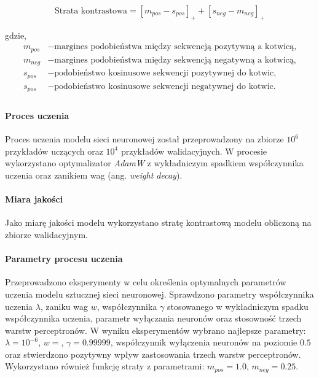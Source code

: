                 \begin{equation}
                    \text{Strata kontrastowa} = [m_{pos} - s_{pos}]_{+} + [s_{neg} - m_{neg}]_{+}
                \end{equation}

                gdzie,
                \begin{align*}
                    m_{pos} &- \text{margines podobieństwa między sekwencją pozytywną a kotwicą,} \\
                    m_{neg} &- \text{margines podobieństwa między sekwencją negatywną a kotwicą,} \\
                    s_{pos} &- \text{podobieństwo kosinusowe sekwencji pozytywnej do kotwic,} \\
                    s_{pos} &- \text{podobieństwo kosinusowe sekwencji negatywnej do kotwic.} \\
                \end{align*}

            \paragraph{Proces uczenia}
                Proces uczenia modelu sieci neuronowej został przeprowadzony na zbiorze $10^{6}$ przykładów uczących oraz $10^{4}$ przykładów walidacyjnych. 
                W procesie wykorzystano optymalizator \textit{AdamW}\cite{Loshchilov2017DecoupledWD} z wykładniczym spadkiem współczynnika uczenia oraz zanikiem wag (ang. \textit{weight decay}).
            
            \paragraph{Miara jakości}
                Jako miarę jakości modelu wykorzystano stratę kontrastową modelu obliczoną na zbiorze walidacyjnym.

            \paragraph{Parametry procesu uczenia}
                Przeprowadzono eksperymenty w celu określenia optymalnych parametrów uczenia modelu sztucznej sieci neuronowej. Sprawdzono parametry współczynnika uczenia $\lambda$, zaniku wag $w$, współczynnika $\gamma$ stosowanego w wykładniczym spadku współczynnika uczenia, parametr wyłączania neuronów oraz stosowność trzech warstw perceptronów. W wyniku eksperymentów wybrano najlepsze parametry: $\lambda = 10^{-6}$, $w = $, $\gamma=0.99999$, współczynnik wyłączenia neuronów na poziomie $0.5$ oraz stwierdzono pozytywny wpływ zastosowania trzech warstw perceptronów. 
                Wykorzystano również funkcję straty z parametrami: $m_{pos} = 1.0$, $m_{neg} = 0.25$.

